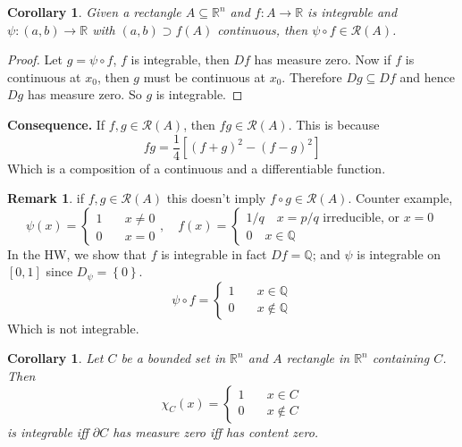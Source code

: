 \documentclass[11pt,a4paper]{article}
\theoremstyle{definition}
\newtheorem{remark}[definition]{Remark}
\theoremstyle{plain}
\newtheorem{corollary}[definition]{Corollary}
\theoremstyle{remark}
\newcommand{\R}{\mathbb{R}}
\newcommand{\Q}{\mathbb{Q}}
\renewcommand{\set}[1]{\left\{ #1 \right\}}
\begin{document}
\begin{corollary}
    Given a rectangle $A \subseteq \R^n$ and $f \colon A \to \R$ is integrable and $\psi \colon (a,b) \to \R$ with $(a,b) \supset f(A)$ continuous, 
    then $\psi \circ f \in \mathcal{R} (A)$.  
\end{corollary}

\begin{proof}
    Let $g = \psi \circ f$, $f$ is integrable, then $Df$ has measure zero. Now if $f$ is continuous at $x_0$, then $g$ must be continuous at $x_0$. Therefore 
    $Dg \subseteq Df$ and hence $Dg$ has measure zero. So $g$ is integrable. 
\end{proof}

\textbf{Consequence.} If $f,g \in \mathcal{R}(A)$, then $fg \in \mathcal{R}(A)$. This is because 
$$fg = \frac{1}{4} [(f+g)^2 - (f-g)^2]$$
Which is a composition of a continuous and a differentiable function. 

\begin{remark}
    if $f,g \in \mathcal{R}(A)$ this doesn't imply $f \circ g \in \mathcal{R}(A)$. Counter example, 
    $$\psi(x) = \begin{cases}
        1 \quad &x \ne 0 \\
        0 \quad &x = 0
    \end{cases}, \quad f(x) = \begin{cases}
        1/q \quad x = p/q \text{ irreducible, or $x = 0$} \\
        0 \quad x \in \Q
    \end{cases}$$
    In the HW, we show that $f$ is integrable in fact $Df = \Q$; and $\psi$ is integrable on $[0,1]$ since $D_\psi = \set{0}$. 
    $$\psi \circ f = \begin{cases}
        1 \quad& x \in \Q \\
        0 \quad &x \not\in \Q
    \end{cases}$$
    Which is not integrable.
\end{remark}

\begin{corollary}
    Let $C$ be a bounded set in $\R^n$ and $A$ rectangle in $\R^n$ containing $C$. Then 
    $$\chi_C (x) = \begin{cases}
        1 \quad& x \in C \\
        0 \quad& x \not\in C
    \end{cases}$$ 
    is integrable iff $\partial C$ has measure zero iff has content zero. 
\end{corollary} 
\end{document}
